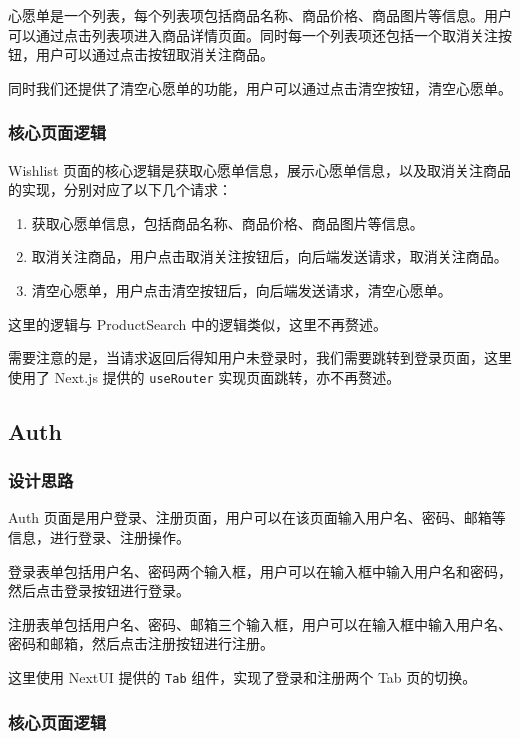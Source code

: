 心愿单是一个列表，每个列表项包括商品名称、商品价格、商品图片等信息。用户可以通过点击列表项进入商品详情页面。同时每一个列表项还包括一个取消关注按钮，用户可以通过点击按钮取消关注商品。

同时我们还提供了清空心愿单的功能，用户可以通过点击清空按钮，清空心愿单。

\subsubsection{核心页面逻辑}

Wishlist 页面的核心逻辑是获取心愿单信息，展示心愿单信息，以及取消关注商品的实现，分别对应了以下几个请求：

\begin{enumerate}
  \item 获取心愿单信息，包括商品名称、商品价格、商品图片等信息。
  \item 取消关注商品，用户点击取消关注按钮后，向后端发送请求，取消关注商品。
  \item 清空心愿单，用户点击清空按钮后，向后端发送请求，清空心愿单。
\end{enumerate}

这里的逻辑与 ProductSearch 中的逻辑类似，这里不再赘述。

需要注意的是，当请求返回后得知用户未登录时，我们需要跳转到登录页面，这里使用了 Next.js 提供的 \texttt{useRouter} 实现页面跳转，亦不再赘述。

\subsection{Auth}

\subsubsection{设计思路}

Auth 页面是用户登录、注册页面，用户可以在该页面输入用户名、密码、邮箱等信息，进行登录、注册操作。

登录表单包括用户名、密码两个输入框，用户可以在输入框中输入用户名和密码，然后点击登录按钮进行登录。

注册表单包括用户名、密码、邮箱三个输入框，用户可以在输入框中输入用户名、密码和邮箱，然后点击注册按钮进行注册。

这里使用 NextUI 提供的 \texttt{Tab} 组件，实现了登录和注册两个 Tab 页的切换。

\subsubsection{核心页面逻辑}

